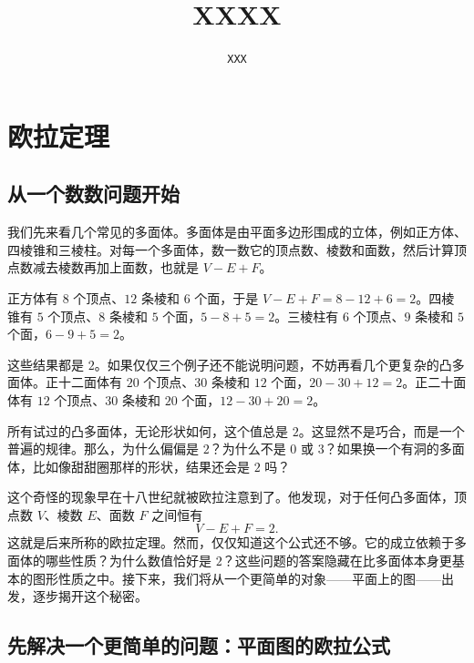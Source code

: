 \documentclass[12pt,UTF8,fontset=none]{ctexbook}
\title{\zihao{0} \bfseries XXXX}
\author{\zihao{2} \texttt{XXX}}
\date{}
\begin{document}
\maketitle
\tableofcontents
\newpage

\chapter{欧拉定理}

\section{从一个数数问题开始}

我们先来看几个常见的多面体。多面体是由平面多边形围成的立体，例如正方体、四棱锥和三棱柱。对每一个多面体，数一数它的顶点数、棱数和面数，然后计算顶点数减去棱数再加上面数，也就是 $V-E+F$。

正方体有 $8$ 个顶点、$12$ 条棱和 $6$ 个面，于是 $V-E+F=8-12+6=2$。四棱锥有 $5$ 个顶点、$8$ 条棱和 $5$ 个面，$5-8+5=2$。三棱柱有 $6$ 个顶点、$9$ 条棱和 $5$ 个面，$6-9+5=2$。


这些结果都是 $2$。如果仅仅三个例子还不能说明问题，不妨再看几个更复杂的凸多面体。正十二面体有 $20$ 个顶点、$30$ 条棱和 $12$ 个面，$20-30+12=2$。正二十面体有 $12$ 个顶点、$30$ 条棱和 $20$ 个面，$12-30+20=2$。


所有试过的凸多面体，无论形状如何，这个值总是 $2$。这显然不是巧合，而是一个普遍的规律。那么，为什么偏偏是 $2$？为什么不是 $0$ 或 $3$？如果换一个有洞的多面体，比如像甜甜圈那样的形状，结果还会是 $2$ 吗？

这个奇怪的现象早在十八世纪就被欧拉注意到了。他发现，对于任何凸多面体，顶点数 $V$、棱数 $E$、面数 $F$ 之间恒有
\[
V-E+F=2.
\]
这就是后来所称的欧拉定理。然而，仅仅知道这个公式还不够。它的成立依赖于多面体的哪些性质？为什么数值恰好是 $2$？这些问题的答案隐藏在比多面体本身更基本的图形性质之中。接下来，我们将从一个更简单的对象——平面上的图——出发，逐步揭开这个秘密。

\section{先解决一个更简单的问题：平面图的欧拉公式}
\end{document}
